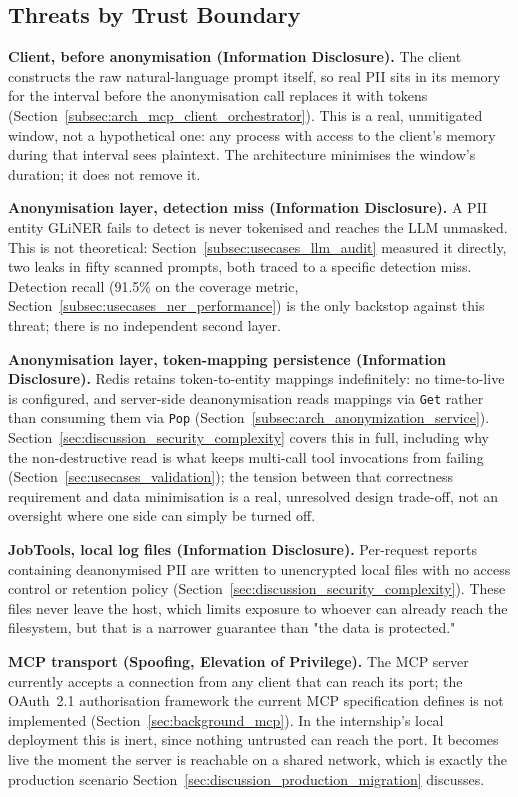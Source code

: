 \subsection{Threats by Trust Boundary}
\label{subsec:discussion_threats_by_boundary}

\textbf{Client, before anonymisation (Information Disclosure).} The client constructs the raw natural-language prompt itself, so real PII sits in its memory for the interval before the anonymisation call replaces it with tokens (Section~\ref{subsec:arch_mcp_client_orchestrator}). This is a real, unmitigated window, not a hypothetical one: any process with access to the client's memory during that interval sees plaintext. The architecture minimises the window's duration; it does not remove it.

\textbf{Anonymisation layer, detection miss (Information Disclosure).} A PII entity GLiNER fails to detect is never tokenised and reaches the LLM unmasked. This is not theoretical: Section~\ref{subsec:usecases_llm_audit} measured it directly, two leaks in fifty scanned prompts, both traced to a specific detection miss. Detection recall (91.5\% on the coverage metric, Section~\ref{subsec:usecases_ner_performance}) is the only backstop against this threat; there is no independent second layer.

\textbf{Anonymisation layer, token-mapping persistence (Information Disclosure).} Redis retains token-to-entity mappings indefinitely: no time-to-live is configured, and server-side deanonymisation reads mappings via \texttt{Get} rather than consuming them via \texttt{Pop} (Section~\ref{subsec:arch_anonymization_service}). Section~\ref{sec:discussion_security_complexity} covers this in full, including why the non-destructive read is what keeps multi-call tool invocations from failing (Section~\ref{sec:usecases_validation}); the tension between that correctness requirement and data minimisation is a real, unresolved design trade-off, not an oversight where one side can simply be turned off.

\textbf{JobTools, local log files (Information Disclosure).} Per-request reports containing deanonymised PII are written to unencrypted local files with no access control or retention policy (Section~\ref{sec:discussion_security_complexity}). These files never leave the host, which limits exposure to whoever can already reach the filesystem, but that is a narrower guarantee than "the data is protected."

\textbf{MCP transport (Spoofing, Elevation of Privilege).} The MCP server currently accepts a connection from any client that can reach its port; the OAuth~2.1 authorisation framework the current MCP specification defines is not implemented (Section~\ref{sec:background_mcp}). In the internship's local deployment this is inert, since nothing untrusted can reach the port. It becomes live the moment the server is reachable on a shared network, which is exactly the production scenario Section~\ref{sec:discussion_production_migration} discusses.

